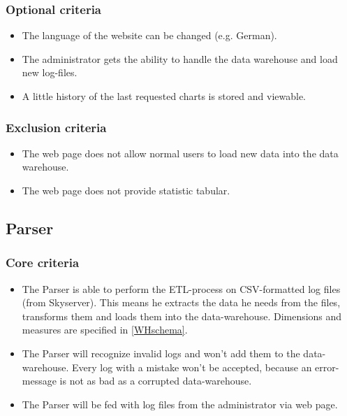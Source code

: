 \subsubsection{Optional criteria}
\begin{itemize}
\item The language of the website can be changed (e.g. German).

\item The administrator gets the ability to handle the data warehouse and load new log-files.

\item A little history of the last requested charts is stored and viewable.
\end{itemize}

\subsubsection{Exclusion criteria}
\begin{itemize}
\item The web page does not allow normal users to load new data into the data warehouse.

\item The web page does not provide statistic tabular. 
\end{itemize}


\subsection{Parser}

\subsubsection{Core criteria} %
\begin{itemize}
\item The Parser is able to perform the ETL-process on CSV-formatted log files (from Skyserver). %
This means he extracts the data he needs from the files, transforms them 
and loads them into the data-warehouse. Dimensions and measures are specified in \ref{WHschema}.
  
\item The Parser will recognize invalid logs and won't add them to the data-warehouse.
 Every log with a mistake won't be accepted, because an error-message is not 
 as bad as a corrupted data-warehouse. 
 
\item The Parser will be fed with log files from the administrator via web page.
\end{itemize} 

